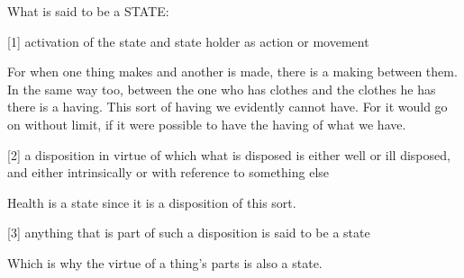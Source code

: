 
What is said to be a STATE:

[1]     activation of the state and state holder as action or movement

        For when one thing makes and another is made,
        there is a making between them. In the same way too,
        between the one who has clothes and the clothes he has
        there is a having. This sort of having we evidently
        cannot have. For it would go on without limit,
        if it were possible to have the having of what we have.

[2]     a disposition in virtue of which what is disposed is either
        well or ill disposed, and either intrinsically or
        with reference to something else

        Health is a state since it is a disposition of this sort.

[3]     anything that is part of such a disposition
        is said to be a state

        Which is why the virtue of a thing's parts is also a state.

